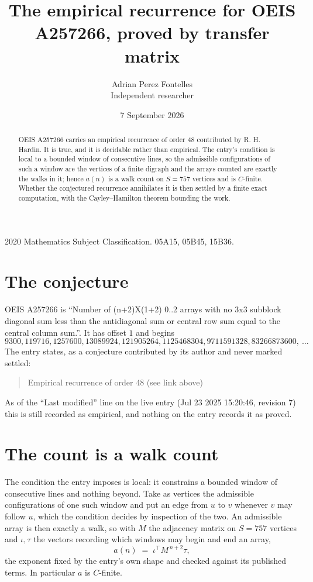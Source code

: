 \documentclass[11pt,a4paper]{article}
\title{The empirical recurrence for OEIS A257266, proved by transfer matrix}
\author{Adrian Perez Fontelles\\ \small Independent researcher}
\date{7 September 2026}
\theoremstyle{plain}
\theoremstyle{definition}
\begin{document}
\maketitle

\begin{abstract}
OEIS A257266 carries an empirical recurrence of order $48$ contributed by R. H. Hardin. It is
true, and it is decidable rather than empirical. The entry's condition is local to a bounded window of consecutive lines, so
the admissible configurations of such a window are the vertices of a finite digraph and the
arrays counted are exactly the walks in it; hence $a(n)$ is a walk count on $S=757$ vertices
and is $C$-finite. Whether the conjectured recurrence annihilates it is then settled by a
finite exact computation, with the Cayley--Hamilton theorem bounding the work.
\end{abstract}

\noindent\small 2020 Mathematics Subject Classification. 05A15, 05B45, 15B36.\normalsize

\section{The conjecture}

OEIS A257266 is ``Number of (n+2)X(1+2) 0..2 arrays with no 3x3 subblock diagonal sum less than the antidiagonal sum or central row sum equal to the central column sum.''. It has offset $1$ and begins
\[
9300, 119716, 1257600, 13089924, 121905264, 1125468304, 9711591328, 83266873600,\ \dots
\]
The entry states, as a conjecture contributed by its author and never marked settled:
\begin{quote}
Empirical recurrence of order 48 (see link above)
\end{quote}
As of the ``Last modified'' line on the live entry (Jul 23 2025 15:20:46, revision 7) this is still
recorded as empirical, and nothing on the entry records it as proved.

\section{The count is a walk count}

The condition the entry imposes is local: it constrains a bounded window of consecutive lines and nothing beyond. Take as
vertices the admissible configurations of one such window and put an edge from $u$ to $v$
whenever $v$ may follow $u$, which the condition decides by inspection of the two. An
admissible array is then exactly a walk, so with $M$ the adjacency matrix on $S=757$ vertices
and $\iota,\tau$ the vectors recording which windows may begin and end an array,
\[
a(n)\;=\;\iota^{\!\top}M^{\,n+2}\tau ,
\]
the exponent fixed by the entry's own shape and checked against its published terms. In
particular $a$ is $C$-finite.
\end{document}
